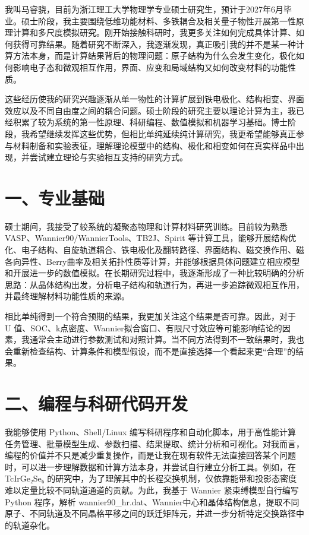 我叫马睿骁，目前为浙江理工大学物理学专业硕士研究生，预计于2027年6月毕业。硕士阶段，我主要围绕低维功能材料、多铁耦合及相关量子物性开展第一性原理计算和多尺度模拟研究。刚开始接触科研时，我更多关注如何完成具体计算、如何获得可靠结果。随着研究不断深入，我逐渐发现，真正吸引我的并不是某一种计算方法本身，而是计算结果背后的物理问题：原子结构为什么会发生变化，极化如何影响电子态和微观相互作用，界面、应变和局域结构又如何改变材料的功能性质。

这些经历使我的研究兴趣逐渐从单一物性的计算扩展到铁电极化、结构相变、界面效应以及不同自由度之间的耦合问题。硕士阶段的研究主要以理论计算为主，我已经积累了较为系统的第一性原理、科研编程、数值模拟和机器学习基础。博士阶段，我希望继续发挥这些优势，但相比单纯延续纯计算研究，我更希望能够真正参与材料制备和实验表征，理解理论模型中的结构、极化和相变如何在真实样品中出现，并尝试建立理论与实验相互支持的研究方式。

\section{一、专业基础}

硕士期间，我接受了较系统的凝聚态物理和计算材料研究训练。目前较为熟悉 VASP、Wannier90/WannierTools、TB2J、Spirit 等计算工具，能够开展结构优化、电子结构、自旋轨道耦合、铁电极化及翻转路径、界面结构、磁交换作用、磁各向异性、Berry曲率及相关拓扑性质等计算，并能够根据具体问题建立相应模型和开展进一步的数值模拟。在长期研究过程中，我逐渐形成了一种比较明确的分析思路：从晶体结构出发，分析电子结构和轨道行为，再进一步追踪微观相互作用，并最终理解材料功能性质的来源。

相比单纯得到一个符合预期的结果，我更加关注这个结果是否可靠。因此，对于 U 值、SOC、k点密度、Wannier拟合窗口、有限尺寸效应等可能影响结论的因素，我通常会主动进行参数测试和对照计算。当不同方法得到不一致结果时，我也会重新检查结构、计算条件和模型假设，而不是直接选择一个看起来更“合理”的结果。

\section{二、编程与科研代码开发}

我能够使用 Python、Shell/Linux 编写科研程序和自动化脚本，用于高性能计算任务管理、批量模型生成、参数扫描、结果提取、统计分析和可视化。对我而言，编程的价值并不只是减少重复操作，而是让我在现有软件无法直接回答某个问题时，可以进一步理解数据和计算方法本身，并尝试自行建立分析工具。例如，在 TcIrGe₂Se₆ 的研究中，为了理解其中的长程交换机制，仅依靠能带和投影态密度难以定量比较不同轨道通道的贡献。为此，我基于 Wannier 紧束缚模型自行编写 Python 程序，解析 wannier90\_hr.dat、Wannier中心和晶体结构信息，提取不同原子、不同轨道及不同晶格平移之间的跃迁矩阵元，并进一步分析特定交换路径中的轨道杂化。

